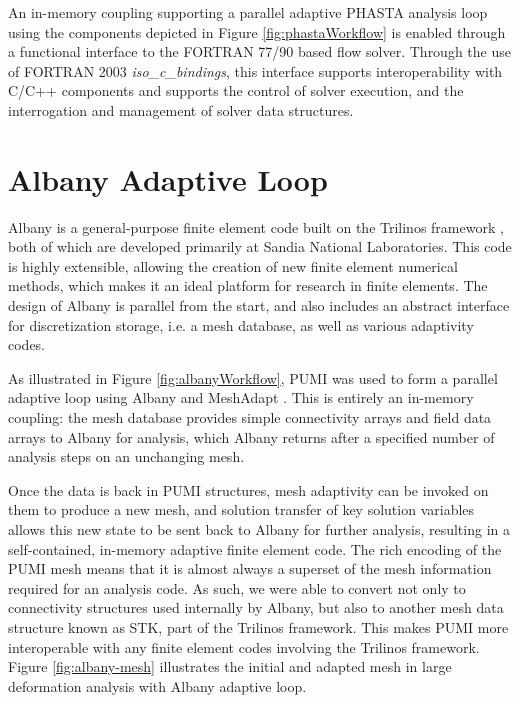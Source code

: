 An in-memory coupling supporting a parallel adaptive PHASTA analysis
loop \cite{smith2016building} using the components depicted in
Figure \ref{fig:phastaWorkflow} is enabled through a functional interface to the
FORTRAN 77/90 based flow solver. Through the use of FORTRAN 2003
\emph{iso\_c\_bindings}, this interface supports interoperability with C/C++
components and supports the control of solver execution, and the interrogation
and management of solver data structures.

\section{Albany Adaptive Loop}

Albany \cite{albany14} is a general-purpose finite element code built on the
Trilinos framework \cite{TrilinosOverview,trilinosweb}, both of which are developed
primarily at Sandia National Laboratories. This code is highly extensible,
allowing the creation of new finite element numerical methods, which makes it an
ideal platform for research in finite elements. The design of Albany is parallel
from the start, and also includes an abstract interface for discretization
storage, i.e. a mesh database, as well as various adaptivity codes.

As illustrated in Figure \ref{fig:albanyWorkflow}, PUMI was used to form a
parallel adaptive loop using Albany and MeshAdapt \cite{smith2016building,meshadaptweb}.
This is entirely an in-memory coupling: the mesh database provides simple
connectivity arrays and field data arrays to Albany for analysis, which Albany
returns after a specified number of analysis steps on an unchanging mesh.

Once the data is back in PUMI structures, mesh adaptivity can be invoked on them
to produce a new mesh, and solution transfer of key solution variables allows
this new state to be sent back to Albany for further analysis,
resulting in a self-contained, in-memory adaptive finite element code. The rich
encoding of the PUMI mesh means that it is almost always a superset of the mesh
information required for an analysis code. As such, we were able to convert not
only to connectivity structures used internally by Albany, but also to another
mesh data structure known as STK, part of the Trilinos framework. This makes
PUMI more interoperable with any finite element codes involving the Trilinos
framework. Figure \ref{fig:albany-mesh} illustrates the initial and adapted mesh
in large deformation analysis with Albany adaptive loop.

